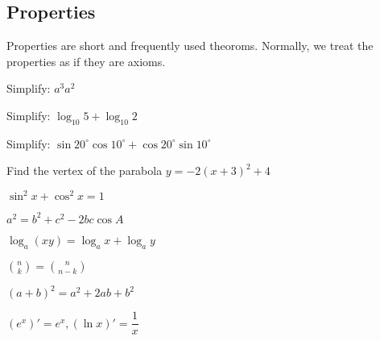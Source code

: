 \subsection{Properties}

Properties are short and frequently used theoroms. Normally, we treat the properties as if they are axioms.

\begin{example}
  Simplify: $a^3 a^2$
\end{example}

\begin{example}
  Simplify: $\log_{10}5 + \log_{10}2$
\end{example}

\begin{example}
  Simplify: $\sin20^\circ \cos10^\circ + \cos20^\circ \sin10^\circ $
\end{example}

\begin{example}
  Find the vertex of the parabola $y = -2(x+3)^2+4$
\end{example}

\begin{example}
  $\sin^2{x} + \cos^2{x} = 1$
\end{example}

\begin{example}
  $a^2 = b^2 + c^2 -2bc\cos{A}$
\end{example}

\begin{example}
  $\log_a{(xy)} = \log_a{x} + \log_a{y}$
\end{example}

\begin{example}
  $\binom{n}{k} = \binom{n}{n-k}$
\end{example}

\begin{example}
  $(a+b)^2 = a^2 + 2ab + b^2$
\end{example}

\begin{example}
  $(e^x)' = e^x, (\ln{x})' = \dfrac{1}{x}$
\end{example}
